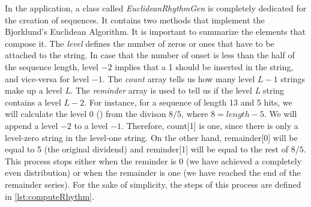 \documentclass[main.tex]{subfiles}
\begin{document}
In the application, a class called \textit{EuclideanRhythmGen} is completely dedicated for the creation of sequences. It contains two methods that implement the Bjorklund's Euclidean Algorithm. It is important to summarize the elements that compose it. The \textit{level} defines the number of zeros or ones that have to be attached to the string. In case that the number of onset is less than the half of the sequence length, level \begin{math}-2\end{math} implies that a 1 should be inserted in the string, and vice-versa for level \begin{math}-1\end{math}. The \textit{count} array tells us how many level \begin{math}L-1\end{math} strings make up a level \textit{L}. The \textit{reminder} array is used to tell us if the level \textit{L} string contains a level \begin{math}L-2\end{math}. For instance, for a sequence of length 13 and 5 hits, we will calculate the level 0 (\begin{math}[01]\end{math}) from the divison \begin{math}8/5\end{math}, where \begin{math}8=length-5\end{math}. We will append a level \begin{math}-2\end{math} to a level \begin{math}-1\end{math}. Therefore, count[1] is one, since there is only a level-zero string in the level-one string. On the other hand, remainder[0] will be equal to 5 (the original dividend) and reminder[1] will be equal to the rest of \begin{math}8/5\end{math}. This process stops either when the reminder is 0 (we have achieved a completely even distribution) or when the remainder is one (we have reached the end of the remainder series). For the sake of simplicity, the steps of this process are defined in \autoref{lst:computeRhythm}.\\
\end{document}
